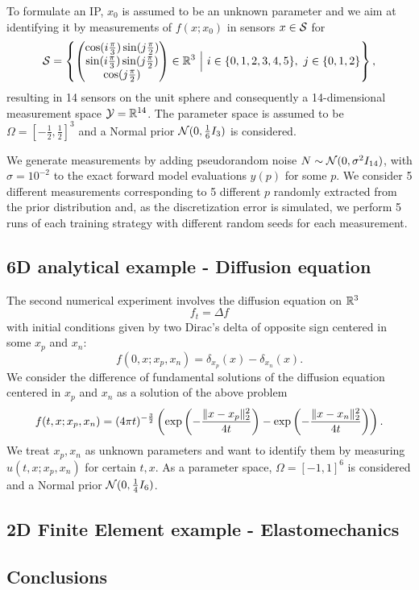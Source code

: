 To formulate an IP, $x_0$ is assumed to be an unknown parameter and we aim at identifying it by measurements of $f(x;x_0)$ in sensors $x \in \mathcal S$ for 
\[
    \mathcal S = \left\{
        \begin{pmatrix}
            \cos( i \frac{\pi}{3}) \sin( j \frac{\pi}{2}) \\
            \sin( i \frac{\pi}{3}) \sin( j \frac{\pi}{2}) \\ 
            \cos( j \frac{\pi}{2})
        \end{pmatrix} 
        \in \mathbb{R}^3 \ \Big| \ i \in \{0,1,2,3,4,5\}, \ j \in \{0,1,2\}
     \right\},
\]
resulting in 14 sensors on the unit sphere and consequently a 14-dimensional measurement space $\mathcal Y = \mathbb{R}^{14}$. \newline
The parameter space is assumed to be $\Omega = \left[-\frac{1}{2}, \frac{1}{2}\right]^3$ and a Normal prior $\mathcal N (0, \frac{1}{6}I_3)$ is considered. \medskip

We generate measurements by adding pseudorandom noise $N \sim \mathcal N (0, \sigma^2 I_{14})$, with $\sigma = 10^{-2}$ to the exact forward model evaluations $y(p)$ for some $p$. 
We consider 5 different measurements corresponding to 5 different $p$ randomly extracted from the prior distribution and, as the discretization error is simulated, we perform 5 runs of each training strategy with different random seeds for each measurement.
\medskip


\subsection{6D analytical example - Diffusion equation}\label{sec:6dexp}

The second numerical experiment involves the diffusion equation on $\mathbb{R}^3$
\[
f_t = \Delta f
\]
with initial conditions given by two Dirac's delta of opposite sign centered in some $x_p$ and $x_n$:
\[
f (0,x; x_p, x_n) = \delta_{x_p}(x) - \delta_{x_n}(x).
\]
We consider the difference of fundamental solutions of the diffusion equation centered in $x_p$ and $x_n$ as a solution of the above problem
\[
f(t,x; x_p, x_n) = (4 \pi t)^{-\frac{3}{2}} \left( \exp \left( - \frac{\lVert x-x_p\rVert_2^2}{4t}\right)- \exp \left( - \frac{\lVert x-x_n\rVert_2^2}{4t}\right) \right).
\]
We treat $x_p, x_n$ as unknown parameters and want to identify them by measuring $u(t,x;x_p, x_n)$ for certain $t,x$. As a parameter space, $\Omega = [-1,1]^6$ is considered and a Normal prior $\mathcal N (0, \frac{1}{4}I_6)$.

\subsection{2D Finite Element example - Elastomechanics}\label{sec:FEexp}



\subsection{Conclusions}\label{sec:concl}
